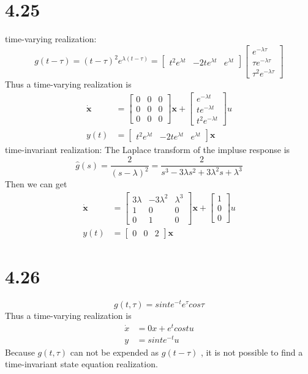 \documentclass{article}
\begin{document}
\section*{4.25}
time-varying realization:
$$g(t-\tau)=(t-\tau)^{2}e^{\lambda(t-\tau)}=
\begin{bmatrix}
t^{2}e^{\lambda t}&-2te^{\lambda t}&e^{\lambda t}
\end{bmatrix}\begin{bmatrix}
e^{-\lambda \tau}\\ \tau e^{-\lambda \tau} \\ \tau^{2}e^{-\lambda \tau}
\end{bmatrix}$$
Thus a time-varying realization is
$$
\begin{aligned}
\dot{\pmb{x}}&=\begin{bmatrix}
0&0&0\\0&0&0\\0&0&0
\end{bmatrix}\pmb{x}+
\begin{bmatrix}
e^{-\lambda t}\\ t e^{-\lambda t} \\ t^{2}e^{-\lambda t}
\end{bmatrix}u\\
y(t)&=\begin{bmatrix}
t^{2}e^{\lambda t}& -2t e^{\lambda t} &e^{\lambda t}
\end{bmatrix}\pmb{x}
\end{aligned}
$$
time-invariant realization:
The Laplace transform of the impluse response is
$$\hat{g}(s)=\frac{2}{(s-\lambda)^{2}}=\frac{2}{s^{3}-3\lambda s^{2}+3\lambda^{2}s+\lambda^{3}}$$
Then we can get
$$
\begin{aligned}
\dot{\pmb{x}}&=\begin{bmatrix}
3\lambda & -3\lambda^{2}&\lambda^{3}\\1&0&0\\0&1&0
\end{bmatrix}\pmb{x}+
\begin{bmatrix}
1\\ 0 \\0
\end{bmatrix}u\\
y(t)&=\begin{bmatrix}
0& 0 &2
\end{bmatrix}\pmb{x}
\end{aligned}
$$
\section*{4.26}
$$g(t,\tau)=sint e^{-t} e^{\tau}cos \tau$$
Thus a time-varying realization is
$$
\begin{aligned}
\dot{x}&=0 x+e^{t}cost u\\
y&=sint e^{-t}u
\end{aligned}
$$
Because $g(t,\tau)$ can not be expended as $g(t-\tau)$ , it is not possible to find a time-invariant state equation realization.
\end{document}
